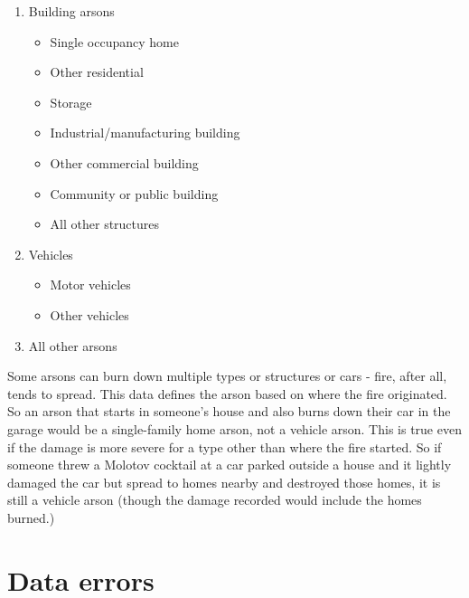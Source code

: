 \documentclass[
  12pt,
  openany]{book}
\providecommand{\tightlist}{%
  \setlength{\itemsep}{0pt}\setlength{\parskip}{0pt}}
\begin{document}
\begin{enumerate}
\def\labelenumi{\arabic{enumi}.}
\tightlist
\item
  Building arsons

  \begin{itemize}
  \tightlist
  \item
    Single occupancy home
  \item
    Other residential
  \item
    Storage
  \item
    Industrial/manufacturing building
  \item
    Other commercial building
  \item
    Community or public building
  \item
    All other structures
  \end{itemize}
\item
  Vehicles

  \begin{itemize}
  \tightlist
  \item
    Motor vehicles
  \item
    Other vehicles
  \end{itemize}
\item
  All other arsons
\end{enumerate}

Some arsons can burn down multiple types or structures or cars - fire, after all, tends to spread. This data defines the arson based on where the fire originated. So an arson that starts in someone's house and also burns down their car in the garage would be a single-family home arson, not a vehicle arson. This is true even if the damage is more severe for a type other than where the fire started. So if someone threw a Molotov cocktail at a car parked outside a house and it lightly damaged the car but spread to homes nearby and destroyed those homes, it is still a vehicle arson (though the damage recorded would include the homes burned.)

\hypertarget{data-errors-1}{%
\section{Data errors}\label{data-errors-1}}
\end{document}
